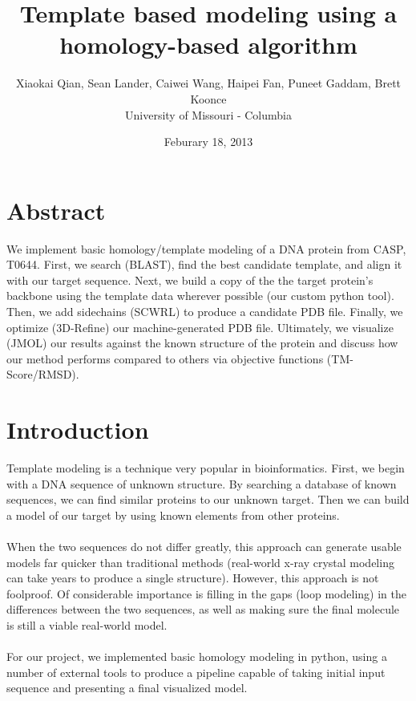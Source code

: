 \documentclass{article}
\title{Template based modeling using a homology-based algorithm}
\author{Xiaokai Qian, Sean Lander, Caiwei Wang, Haipei Fan, Puneet Gaddam, Brett Koonce\\University of Missouri - Columbia}
\date{Feburary 18, 2013}
\begin{document}
\maketitle

\section{Abstract}
We implement basic homology/template modeling of a DNA protein from CASP, T0644.  First, we search (BLAST), find the best candidate template, and align it with our target sequence.  Next, we build a copy of the the target protein's backbone using the template data wherever possible (our custom python tool).  Then, we add sidechains (SCWRL) to produce a candidate PDB file.  Finally, we optimize (3D-Refine) our machine-generated PDB file.  Ultimately, we visualize (JMOL) our results against the known structure of the protein and discuss how our method performs compared to others via objective functions (TM-Score/RMSD).

\section{Introduction}

Template modeling is a technique very popular in bioinformatics.  First, we begin with a DNA sequence of unknown structure.  By searching a database of known sequences, we can find similar proteins to our unknown target.  Then we can build a model of our target by using known elements from other proteins.\\\\
When the two sequences do not differ greatly, this approach can generate usable models far quicker than traditional methods (real-world x-ray crystal modeling can take years to produce a single structure).  However, this approach is not foolproof.  Of considerable importance is filling in the gaps (loop modeling) in the differences between the two sequences, as well as making sure the final molecule is still a viable real-world model.\\\\
For our project, we implemented basic homology modeling in python, using a number of external tools to produce a pipeline capable of taking initial input sequence and presenting a final visualized model.
\end{document}
